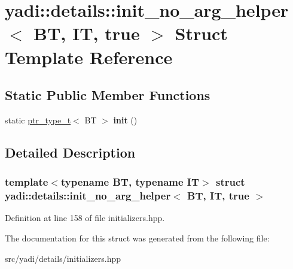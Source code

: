 \hypertarget{structyadi_1_1details_1_1init__no__arg__helper_3_01_b_t_00_01_i_t_00_01true_01_4}{}\section{yadi\+:\+:details\+:\+:init\+\_\+no\+\_\+arg\+\_\+helper$<$ BT, IT, true $>$ Struct Template Reference}
\label{structyadi_1_1details_1_1init__no__arg__helper_3_01_b_t_00_01_i_t_00_01true_01_4}
\subsection*{Static Public Member Functions}
\begin{DoxyCompactItemize}
\item 
\mbox{\label{structyadi_1_1details_1_1init__no__arg__helper_3_01_b_t_00_01_i_t_00_01true_01_4_a12f7dde0d08a746a0b4855b6009bbb40}} 
static \hyperlink{namespaceyadi_a92290eb27cd90666aa87b17d854af9fe}{ptr\+\_\+type\+\_\+t}$<$ BT $>$ {\bfseries init} ()
\end{DoxyCompactItemize}


\subsection{Detailed Description}
\subsubsection*{template$<$typename BT, typename IT$>$\newline
struct yadi\+::details\+::init\+\_\+no\+\_\+arg\+\_\+helper$<$ B\+T, I\+T, true $>$}



Definition at line 158 of file initializers.\+hpp.



The documentation for this struct was generated from the following file\+:\begin{DoxyCompactItemize}
\item 
src/yadi/details/initializers.\+hpp\end{DoxyCompactItemize}
